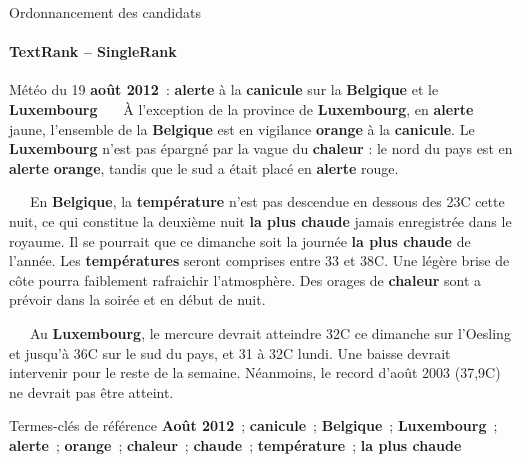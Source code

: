   \begin{frame}{Ordonnancement des candidats}\framesubtitle{TextRank -- SingleRank}
    \begin{exampleblock}{\small
      Météo du 19 \textbf{\textcolor{termithorange}{août 2012}}~:
      \textbf{alerte} à la \textbf{canicule} sur la \textbf{Belgique} et le
      \textbf{Luxembourg}
    }\justifying\small
      ~~~À l'exception de la province de \textbf{Luxembourg}, en
      \textbf{alerte} jaune, l'ensemble de la \textbf{Belgique} est en
      \textcolor{termithorange}{vigilance \textbf{orange}} à la
      \textbf{canicule}. Le \textbf{Luxembourg} n'est pas épargné par la vague
      du \textbf{chaleur} : le nord du pays est en
      \textcolor{termithorange}{\textbf{alerte} \textbf{orange}}, tandis que le
      sud a était placé en \textbf{alerte} rouge.

      ~~~En \textbf{Belgique}, la \textbf{température} n'est pas descendue
      en dessous des 23\degre{}C cette nuit, ce qui constitue la
      \textcolor{termithorange}{deuxième nuit} \textbf{la plus chaude} jamais
      enregistrée dans le royaume. Il se pourrait que ce dimanche soit la
      journée \textbf{la plus chaude} de l'année. Les \textbf{températures}
      seront comprises entre 33 et 38\degre{}C. Une
      \textcolor{termithorange}{légère brise} de côte pourra faiblement
      rafraichir l'atmosphère. Des orages de \textbf{chaleur} sont a prévoir
      dans la soirée et en début de nuit.

      ~~~Au \textbf{Luxembourg}, le mercure devrait atteindre 32\degre{}C ce
      dimanche sur l'Oesling et jusqu'à 36\degre{}C sur le sud du pays, et 31 à
      32\degre{}C lundi. Une baisse devrait intervenir pour le reste de la
      semaine. Néanmoins, le record d'\textcolor{termithorange}{août 2003}
      (37,9\degre{}C) ne devrait pas être atteint.

      \begin{exampleblock}{\small Termes-clés de référence}\justifying\small
        \textbf{Août 2012}~; \textbf{canicule}~;
        \textbf{Belgique}~; \textbf{Luxembourg}~; \textbf{alerte}~;
        \textbf{orange}~; \textbf{chaleur}~; \textbf{chaude}~;
        \textbf{température}~; \textbf{la plus chaude}
      \end{exampleblock}
    \end{exampleblock}
  \end{frame}

